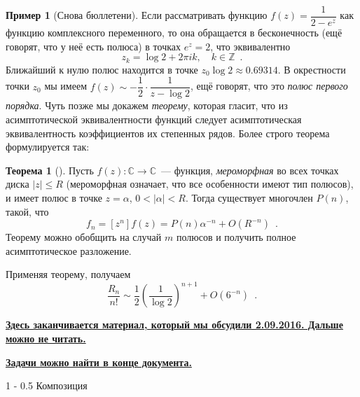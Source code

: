 \documentclass{article}
\makeatletter
\def \Z {\mathbb Z}
\def \C {\mathbb C}
\theoremstyle{definition}
\newtheorem{example}{Пример}
\newtheorem*{theorem}{Теорема}
\renewcommand{\section}{\@startsection
{section}%
{1}%
{\z@}%
{-\baselineskip}%
{0.5\baselineskip}%
{\centering\large\scshape}} %
\makeatother
\begin{document}
\begin{example}[Снова бюллетени]
Если рассматривать функцию \( f(z) = \dfrac{1}{2 - e^z} \) как функцию 
комплексного переменного, то она обращается в бесконечность (ещё говорят, что у 
неё есть полюса) в точках \( e^z = 2 \), что эквивалентно
\[
	z_k = \log 2 + 2 \pi i k, \quad k \in \Z \enspace .
\]
Ближайший к нулю полюс находится в точке \( z_0 \log 2 \approx 0.69314 \). В 
окрестности точки \( z_0 \) мы имеем \( f(z) \sim -\dfrac12 \cdot \dfrac{1}{z - 
\log 
2}\), ещё говорят, что это \textit{полюс первого порядка}. Чуть позже мы 
докажем \textit{теорему}, которая гласит, что из асимптотической 
эквивалентности функций следует асимптотическая эквивалентность коэффициентов 
их степенных рядов. Более строго теорема формулируется так:

\begin{theorem}[{\cite[Theorem IV.10, page 258]{ac}}]
	Пусть \( f(z) \colon \C \to \C \)~--- функция, \textit{мероморфная} во всех 
	точках диска \( |z| \leq R \) (мероморфная означает, что все особенности 
	имеют тип полюсов), и имеет полюс в точке \( z = \alpha \), \( 0 < |\alpha| 
	< R 
	\). Тогда существует многочлен \( P(n) \), такой, что
	\[
		f_n = [z^n] f(z) = P(n) \alpha^{-n} + O(R^{-n}) \enspace .
	\]
	Теорему можно обобщить на случай \( m \) полюсов и получить полное 
	асимптотическое разложение.
\end{theorem}
Применяя теорему, получаем
\[
	\dfrac{R_n}{n!} \sim \dfrac12 \left(\dfrac{1}{\log 2}\right)^{n+1} + 
	O(6^{-n}) 
	\enspace .
\]
\end{example}

\begin{center}
	\underline{\textbf{Здесь заканчивается материал, который мы обсудили 
	2.09.2016. Дальше можно не читать.}}
	
	\underline{\textbf{Задачи можно найти в конце документа.}}
\end{center}

\section{Композиция}
\end{document}
